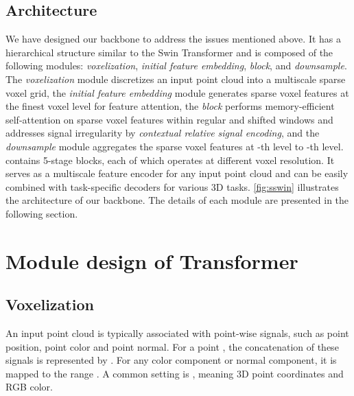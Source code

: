 \documentclass[10pt,twocolumn,letterpaper]{article}
\begin{document}
\subsection{{\SST} Architecture}
We have designed our {\SST} backbone to address the issues mentioned above. It has a hierarchical structure similar to the Swin Transformer and is composed of the following modules: \emph{voxelization}, \emph{initial feature embedding}, \emph{{\SST} block}, and \emph{downsample}. The \emph{voxelization} module discretizes an input point cloud into a multiscale sparse voxel grid, the \emph{initial feature embedding} module generates sparse voxel features at the finest voxel level for feature attention, the \emph{{\SST} block} performs memory-efficient self-attention on sparse voxel features within regular and shifted windows and addresses signal irregularity by \emph{contextual relative signal encoding}, and the \emph{downsample} module aggregates the sparse voxel features at -th level to -th level. {\SST} contains 5-stage {\SST} blocks, each of which operates at different voxel resolution. It serves as a multiscale feature encoder for any input point cloud and can be easily combined with task-specific decoders for various 3D tasks. \cref{fig:sswin} illustrates the architecture of our backbone. The details of each module are presented in the following section.

\section{Module design of {\SST} Transformer} \label{sec:module}

\subsection{Voxelization} \label{subsec:voxelization}

 An input point cloud is typically associated with point-wise signals, such as point position, point color and point normal. For a point , the concatenation of these signals is represented by . For any color component or normal component, it is mapped to the range .  A common setting is , meaning 3D point coordinates and RGB color.
\end{document}

